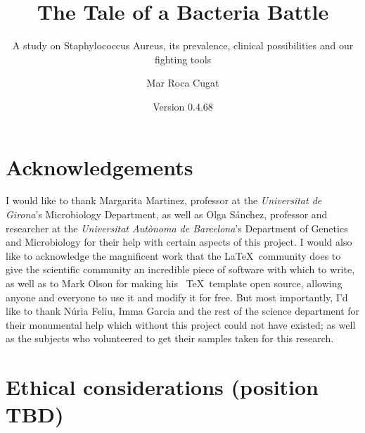 \documentclass[fontsize=12pt,twoside=semi,openright,numbers=noenddot,parskip=half]{scrbook}
\title{The Tale of a Bacteria Battle}
\subtitle{A study on Staphylococcus Aureus, its prevalence, clinical possibilities and our fighting tools}
\author{Mar Roca Cugat}
\date{Version 0.4.68}
\begin{document}
\maketitle
\cleardoublepage
\renewcommand{\thepage}{\arabic{page}}
\frontmatter
\chapter{Acknowledgements}
\begin{center}
I would like to thank Margarita Martinez, professor at the \emph{Universitat de Girona}'s Microbiology Department, as well as Olga Sánchez, professor and researcher at the \emph{Universitat Autònoma de Barcelona}'s Department of Genetics and Microbiology for their help with certain aspects of this project. \newline
I would also like to acknowledge the magnificent work that the \LaTeX\ community does to give the scientific community an incredible piece of software with which to write, as well as to Mark Olson for making his \KOMAScript\ \TeX\ template open source, allowing anyone and everyone to use it and modify it for free.\newline
But most importantly, I'd like to thank Núria Feliu, Imma Garcia and the rest of the science department for their monumental help which without this project could not have existed; as well as the subjects who volunteered to get their samples taken for this research.
\end{center}
\chapter{Ethical considerations (position TBD)}
\end{document}

